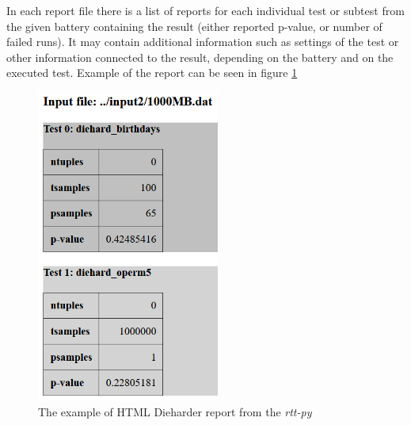\documentclass[
  digital,     %
  oneside,     %
  nosansbold,  %
  nocolorbold, %
  nolof,         %
  nolot,         %
]{fithesis4}
\begin{document}
In each report file there is a list of reports for each individual test or subtest from the given battery containing the result (either reported p-value, or number of failed runs). It may contain additional information such as settings of the test or other information connected to the result, depending on the battery and on the executed test. Example of the  report can be seen in figure \ref{fig:rtt_py_html}
\begin{figure}
  \begin{center}
    \includegraphics[width=6cm]{figures/rtt-py-dieharder-html.png}
  \end{center}
  \caption{The example of HTML Dieharder report from the \emph{rtt-py}}
  \label{fig:rtt_py_html}
\end{figure}


\end{document}
